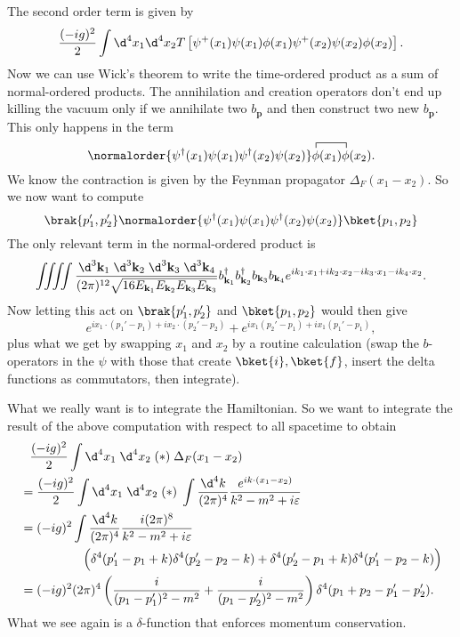 \documentclass[a4paper]{article}
\begin{document}
\begin{eg}
  The second order term is given by
  \[
    \frac{(-ig)^2}{2}\int \d^4 x_1 \d^4 x_2 T\left[\psi^+(x_1) \psi(x_1) \phi(x_1) \psi^+(x_2) \psi(x_2) \phi(x_2)\right].
  \]
  Now we can use Wick's theorem to write the time-ordered product as a sum of normal-ordered products. The annihilation and creation operators don't end up killing the vacuum only if we annihilate two $b_\mathbf{p}$ and then construct two new $b_\mathbf{p}$. This only happens in the term
  \[
    \normalorder{\psi^\dagger(x_1) \psi(x_1) \psi^\dagger(x_2) \psi(x_2)} \contraction{}{\phi}{(x_1)}{\phi}\phi(x_1)\phi(x_2).
  \]
  We know the contraction is given by the Feynman propagator $\Delta_F(x_1 - x_2)$. So we now want to compute
  \[
    \brak{p_1', p_2'} \normalorder{\psi^\dagger(x_1) \psi(x_1) \psi^\dagger(x_2) \psi(x_2)}\bket{p_1, p_2}
  \]
  The only relevant term in the normal-ordered product is
  \[
    \iiiint \frac{\d^3 \mathbf{k}_1\;\d^3 \mathbf{k}_2 \;\d^3 \mathbf{k}_3 \;\d^3 \mathbf{k}_4}{(2\pi)^{12}\sqrt{16 E_{\mathbf{k}_1} E_{\mathbf{k}_2} E_{\mathbf{k}_3} E_{\mathbf{k}_3}}} b_{\mathbf{k}_1}^\dagger b_{\mathbf{k}_2}^\dagger b_{\mathbf{k}_3} b_{\mathbf{k}_4} e^{ik_1 \cdot x_1 + i k_2 \cdot x_2 - i k_3 \cdot x_1 - i k_4 \cdot x_2}.
  \]
  Now letting this act on $\brak{p_1', p_2'}$ and $\bket{p_1, p_2}$ would then give
  \[
    e^{ix_1 \cdot (p_1' - p_1) + i x_2 \cdot (p_2' - p_2)} + e^{ix_1(p_2' - p_1) + i x_1 (p_1' - p_1)}, \tag{$*$}
  \]
  plus what we get by swapping $x_1$ and $x_2$ by a routine calculation (swap the $b$-operators in the $\psi$ with those that create $\bket{i}, \bket{f}$, insert the delta functions as commutators, then integrate).

  What we really want is to integrate the Hamiltonian. So we want to integrate the result of the above computation with respect to all spacetime to obtain
  \begin{align*}
    &\hphantom{=}\frac{(-ig)^2}{2} \int \d^4 x_1\;\d^4 x_2 \;(*)\; \Delta_F(x_1 - x_2)\\
    &= \frac{(-ig)^2}{2}\int \d^4 x_1\;\d^4 x_2 \;(*)\; \int \frac{\d^4 k}{(2\pi)^4} \frac{e^{ik\cdot(x_1 - x_2)}}{k^2 - m^2 + i \varepsilon}\\
    &=(-ig)^2 \int \frac{\d^4 k}{(2\pi)^4} \frac{i (2\pi)^8}{k^2 - m^2 + i \varepsilon} \\
    &\hphantom{=(-ig)^2 \int}\Big(\delta^4(p_1' - p_1 + k) \delta^4(p_2' - p_2 - k) + \delta^4(p_2' - p_1 + k) \delta^4(p_1' - p_2 - k)\Big)\\
    &= (-ig)^2 (2\pi)^4\left(\frac{i}{(p_1 - p_1')^2 - m^2} + \frac{i}{(p_1 - p_2')^2 - m^2}\right) \delta^4(p_1 + p_2 - p_1' - p_2').
  \end{align*}
  What we see again is a $\delta$-function that enforces momentum conservation.
\end{eg}
\end{document}
